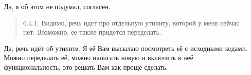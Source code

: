 Да, я об этом не подумал, согласен.

\begin{quote}

	6.4.1. Видимо, речь идет про отдельную утилиту, которой у меня сейчас нет. Возможно, ее также
	придется переделать.

\end{quote}

Да, речь идёт об утилите. Я её Вам высылаю посмотреть её с исходными кодами. Можно переделать её,
можно написать новую и включить в неё функциональность, это решать Вам как проще сделать.


